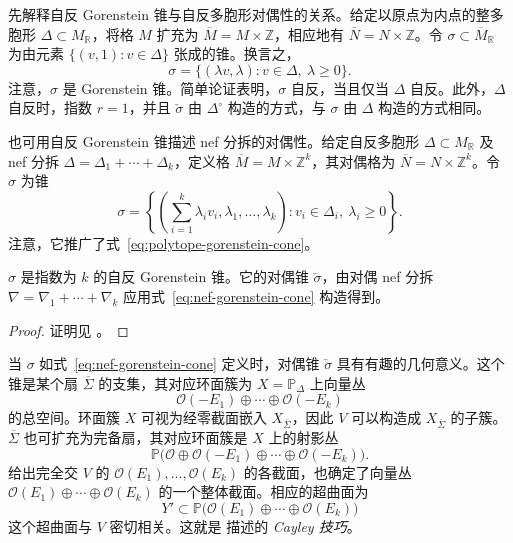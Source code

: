 先解释自反 Gorenstein 锥与自反多胞形对偶性的关系。给定以原点为内点的整多胞形 $\Delta\subset M_{\mathbb R}$，将格 $M$ 扩充为 $\overline M=M\times\mathbb Z$，相应地有 $\overline N=N\times\mathbb Z$。令 $\sigma\subset\overline M_{\mathbb R}$ 为由元素 $\{(v,1):v\in\Delta\}$ 张成的锥。换言之，
\begin{equation}\label{eq:polytope-gorenstein-cone}
\sigma=\{(\lambda v,\lambda):v\in\Delta,\ \lambda\geq0\}.
\end{equation}
注意，$\sigma$ 是 Gorenstein 锥。简单论证表明，$\sigma$ 自反，当且仅当 $\Delta$ 自反。此外，$\Delta$ 自反时，指数 $r=1$，并且 $\check\sigma$ 由 $\Delta^\circ$ 构造的方式，与 $\sigma$ 由 $\Delta$ 构造的方式相同。

也可用自反 Gorenstein 锥描述 nef 分拆的对偶性。给定自反多胞形 $\Delta\subset M_{\mathbb R}$ 及 nef 分拆 $\Delta=\Delta_1+\cdots+\Delta_k$，定义格 $\overline M=M\times\mathbb Z^k$，其对偶格为 $\overline N=N\times\mathbb Z^k$。令 $\sigma$ 为锥
\begin{equation}\label{eq:nef-gorenstein-cone}
\sigma=\left\{\left(\sum_{i=1}^k\lambda_iv_i,
\lambda_1,\ldots,\lambda_k\right):
v_i\in\Delta_i,\ \lambda_i\geq0\right\}.
\end{equation}
注意，它推广了式~\eqref{eq:polytope-gorenstein-cone}。

\begin{proposition}\label{prop:nef-cone-duality}
$\sigma$ 是指数为 $k$ 的自反 Gorenstein 锥。它的对偶锥 $\check\sigma$，由对偶 nef 分拆 $\nabla=\nabla_1+\cdots+\nabla_k$ 应用式~\eqref{eq:nef-gorenstein-cone} 构造得到。
\end{proposition}
\begin{proof}
证明见 。
\end{proof}

当 $\sigma$ 如式~\eqref{eq:nef-gorenstein-cone} 定义时，对偶锥 $\check\sigma$ 具有有趣的几何意义。这个锥是某个扇 $\overline\Sigma$ 的支集，其对应环面簇为 $X=\mathbb P_\Delta$ 上向量丛
\begin{equation}\label{eq:nef-vector-bundle}
\mathcal O(-E_1)\oplus\cdots\oplus\mathcal O(-E_k)
\end{equation}
的总空间。环面簇 $X$ 可视为经零截面嵌入 $X_{\overline\Sigma}$，因此 $V$ 可以构造成 $X_{\overline\Sigma}$ 的子簇。$\overline\Sigma$ 也可扩充为完备扇，其对应环面簇是 $X$ 上的射影丛
\[
\mathbb P\bigl(\mathcal O\oplus\mathcal O(-E_1)\oplus\cdots\oplus\mathcal O(-E_k)\bigr).
\]
给出完全交 $V$ 的 $\mathcal O(E_1),\ldots,\mathcal O(E_k)$ 的各截面，也确定了向量丛 $\mathcal O(E_1)\oplus\cdots\oplus\mathcal O(E_k)$ 的一个整体截面。相应的超曲面为
\begin{equation}\label{eq:cayley-hypersurface}
Y'\subset\mathbb P\bigl(\mathcal O(E_1)\oplus\cdots\oplus\mathcal O(E_k)\bigr)
\end{equation}
这个超曲面与 $V$ 密切相关。这就是  描述的 \emph{Cayley 技巧}。

